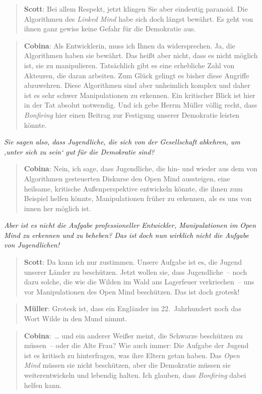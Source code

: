 \documentclass{scrartcl}
\newenvironment{frage}{\itshape}{}
\newenvironment{antworta}{
  \begin{quotation}
  }{
  \end{quotation}
}
\newenvironment{antwortb}{
  \begin{quotation}
  }{
  \end{quotation}
}
\newcommand{\name}[1]{\textbf{#1}}
\begin{document}
\begin{antwortb}
\name{Scott}: Bei allem Respekt, jetzt klingen Sie aber eindeutig
paranoid. Die Algorithmen des \emph{Linked Mind} habe sich doch
längst bewährt. Es geht von ihnen ganz gewiss keine Gefahr
für die Demokratie aus.
\end{antwortb}


\begin{antworta}
\name{Cobina}: Als Entwicklerin, muss ich Ihnen da
widersprechen. Ja, die Algorithmen haben sie bewährt. Das
heißt aber nicht, dass es nicht möglich ist, sie zu
manipulieren. Tatsächlich gibt es eine erhebliche Zahl von
Akteuren, die daran arbeiten. Zum Glück gelingt es bisher
diese Angriffe abzuwehren. Diese Algorithmen sind aber
unheimlich komplex und daher ist es sehr schwer
Manipulationen zu erkennen. Ein kritischer Blick ist hier in
der Tat absolut notwendig. Und ich gebe Herrm Müller völlig
recht, dass \emph{Bonfiring} hier einen Beitrag zur Festigung
unserer Demokratie leisten könnte.
\end{antworta}


\begin{frage}
Sie sagen also, dass Jugendliche, die sich von der
Gesellschaft abkehren, um ‚unter sich zu sein‘ gut für die
Demokratie sind?
\end{frage}


\begin{antworta}
\name{Cobina}: Nein, ich sage, dass Jugendliche, die hin- und
wieder aus dem von Algorithmen gesteuerten Diskurse den Open
Mind aussteigen, eine heilsame, kritische Außenperspektive
entwickeln könnte, die ihnen zum Beispiel helfen könnte,
Manipulationen früher zu erkennen, als es uns von innen her
möglich ist.
\end{antworta}


\begin{frage}
Aber ist es nicht die Aufgabe professioneller Entwickler,
Manipulationen im \emph{Open Mind} zu erkennen und zu beheben? Das
ist doch nun wirklich nicht die Aufgabe von Jugendlichen!
\end{frage}


\begin{antworta}
\name{Scott}: Da kann ich nur zustimmen. Unsere Aufgabe ist es, die
Jugend unserer Länder zu beschützen. Jetzt wollen sie, dass
Jugendliche~– noch dazu solche, die wie die Wilden im Wald
ans Lagerfeuer verkriechen~– uns vor Manipulationen des Open
Mind beschützen. Das ist doch grotesk!
\end{antworta}


\begin{antwortb}
\name{Müller}: Grotesk ist, dass ein Engländer im 22.~Jahrhundert
noch das Wort Wilde in den Mund nimmt.
\end{antwortb}


\begin{antworta}
\name{Cobina}:~… und ein anderer Weißer meint, die Schwarze
beschützen zu müssen~– oder die Alte Frau? Wie auch immer:
Die Aufgabe der Jugend ist es kritisch zu hinterfragen, was
ihre Eltern getan haben. Das \emph{Open Mind} müssen sie nicht
beschützen, aber die Demokratie müssen sie weiterentwickeln
und lebendig halten. Ich glauben, dass \emph{Bonfiring} dabei
helfen kann.
\end{antworta}
\end{document}
